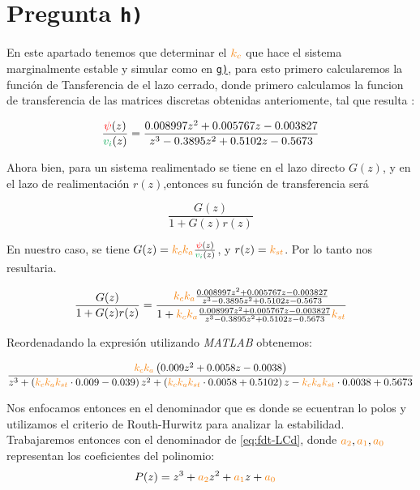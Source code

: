 \section{Pregunta \texttt{h)}}\label{pregunta-h}


En este apartado tenemos que determinar el $\nara{k_c}$  que hace el sistema marginalmente
estable y simular como en \hyperref[pregunta-g]{\texttt{g)}}, para esto primero 
calcularemos la función de Tansferencia de el lazo cerrado, donde primero calculamos la funcion de transferencia de las matrices discretas obtenidas anteriomente, tal que resulta :

\begin{equation}
   \frac{\rojo{\psi}(z)}{\verd{v_{i}}(z)} = \frac{0.008997z^2 + 0.005767 z - 0.003827}
    {z^3 - 0.3895 z^2 + 0.5102 z -0.5673}
\end{equation}


Ahora bien, para un sistema realimentado se tiene en el lazo directo $G(z)$, y 
en el lazo de realimentación $r(z)$,entonces su función de transferencia será

\begin{equation}
    \frac{G(z)}{1 + G(z)r(z)}
\end{equation}

En nuestro caso, se tiene $G(z) = \nara{k_{c} k_{a}} \frac{\rojo{\psi}(z)}{\verd{v_i}(z)}$,
y $r(z) = \nara{k_{st}}$. Por lo tanto nos resultaria.

\begin{equation}
    \frac{G(z)}{1 + G(z)r(z)} = \dfrac{\nara{k_ck_a} \frac{0.008997z^2 + 0.005767 z - 0.003827}
    {z^3 - 0.3895 z^2 + 0.5102 z -0.5673}}
    {1+\nara{k_ck_a} \frac{0.008997z^2 + 0.005767 z - 0.003827}
    {z^3 - 0.3895 z^2 + 0.5102 z -0.5673}\nara{k_{st}}}
\end{equation}

Reordenadando la expresión utilizando \textit{MATLAB} obtenemos:

\begin{equation}\label{eq:fdt-LCd}
    \frac{ \nara{k_c k_a} \left( 0.009 z^2 + 0.0058 z - 0.0038 \right)}
    { z^3 + \left( \nara{k_c k_a k_{st}} \cdot 0.009 - 0.039 \right) z^2 
    + \left( \nara{k_c k_a k_{st}} \cdot 0.0058 + 0.5102 \right) z 
    - \nara{k_c k_a k_{st}} \cdot 0.0038 + 0.5673 }
\end{equation}


Nos enfocamos entonces en el denominador que es donde se ecuentran lo polos y
utilizamos el criterio de Routh-Hurwitz para analizar la estabilidad. 
Trabajaremos entonces con el denominador de \eqref{eq:fdt-LCd}, donde $\nara{a_2},\nara{a_1},\nara{a_0}$
representan los coeficientes del polinomio:
\begin{align}
    P(z) =  z^3 + \nara{a_2} z^2 + \nara{a_1} z + \nara{a_0} &
\end{align}

